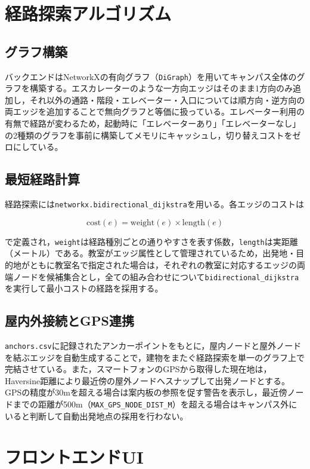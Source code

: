 \documentclass[a4paper,10.5pt]{ltjsarticle}
\begin{document}
\section{経路探索アルゴリズム}
\label{sec:routing}

\subsection{グラフ構築}

バックエンドはNetworkXの有向グラフ（\texttt{DiGraph}）を用いてキャンパス全体のグラフを構築する。エスカレーターのような一方向エッジはそのまま1方向のみ追加し，それ以外の通路・階段・エレベーター・入口については順方向・逆方向の両エッジを追加することで無向グラフと等価に扱っている。エレベーター利用の有無で経路が変わるため，起動時に「エレベーターあり」「エレベーターなし」の2種類のグラフを事前に構築してメモリにキャッシュし，切り替えコストをゼロにしている。

\subsection{最短経路計算}

経路探索には\texttt{networkx.bidirectional\_dijkstra}を用いる。各エッジのコストは

\[
\mathrm{cost}(e) = \mathrm{weight}(e) \times \mathrm{length}(e)
\]

で定義され，\texttt{weight}は経路種別ごとの通りやすさを表す係数，\texttt{length}は実距離（メートル）である。教室がエッジ属性として管理されているため，出発地・目的地がともに教室名で指定された場合は，それぞれの教室に対応するエッジの両端ノードを候補集合とし，全ての組み合わせについて\texttt{bidirectional\_dijkstra}を実行して最小コストの経路を採用する。

\subsection{屋内外接続とGPS連携}

\texttt{anchors.csv}に記録されたアンカーポイントをもとに，屋内ノードと屋外ノードを結ぶエッジを自動生成することで，建物をまたぐ経路探索を単一のグラフ上で完結させている。また，スマートフォンのGPSから取得した現在地は，Haversine距離により最近傍の屋外ノードへスナップして出発ノードとする。GPSの精度が30mを超える場合は案内板の参照を促す警告を表示し，最近傍ノードまでの距離が500m（\texttt{MAX\_GPS\_NODE\_DIST\_M}）を超える場合はキャンパス外にいると判断して自動出発地点の採用を行わない。

\section{フロントエンドUI}
\label{sec:frontend}
\end{document}
